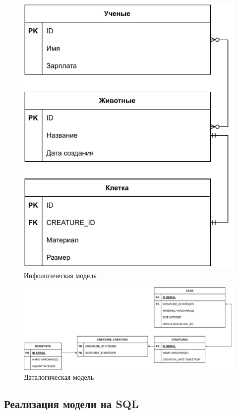 \begin{figure}[ht]
    \centering
    \includegraphics[height=0.4\textheight]{img/infological.pdf}
    \caption{Инфологическая модель}
\end{figure}


\begin{figure}[ht]
    \centering
    \includegraphics[width=\textwidth]{img/datalogical.pdf}
    \caption{Даталогическая модель}
\end{figure}

\subsection{Реализация модели на SQL}
\inputminted{SQL}{../scheme.sql}